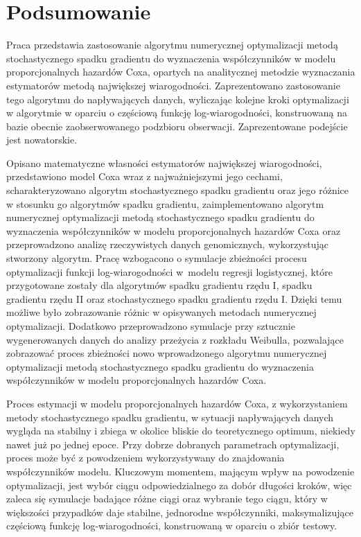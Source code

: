 \chapter*{Podsumowanie}
Praca przedstawia zastosowanie algorytmu numerycznej optymalizacji metodą stochastycznego spadku gradientu do wyznaczenia współczynników w modelu proporcjonalnych hazardów Coxa, opartych na analitycznej metodzie wyznaczania estymatorów metodą największej wiarogodności. Zaprezentowano zastosowanie tego algorytmu do napływających danych, wyliczając kolejne kroki optymalizacji w algorytmie w oparciu o częściową funkcję log-wiarogodności, konstruowaną na bazie obecnie zaobserwowanego podzbioru obserwacji. Zaprezentowane podejście jest nowatorskie.

Opisano matematyczne własności estymatorów największej wiarogodności, przedstawiono model Coxa wraz z najważniejszymi jego cechami, scharakteryzowano algorytm stochastycznego spadku gradientu oraz jego różnice w stosunku go algorytmów spadku gradientu, zaimplementowano algorytm numerycznej optymalizacji metodą stochastycznego spadku gradientu do wyznaczenia współczynników w modelu proporcjonalnych hazardów Coxa oraz przeprowadzono analizę rzeczywistych danych genomicznych, wykorzystując stworzony algorytm. Pracę wzbogacono o symulacje zbieżności procesu optymalizacji funkcji log-wiarogodności w~modelu regresji logistycznej, które przygotowane zostały dla algorytmów spadku gradientu rzędu I, spadku gradientu rzędu II oraz stochastycznego spadku gradientu rzędu I. Dzięki temu możliwe było zobrazowanie różnic w opisywanych metodach numerycznej optymalizacji. Dodatkowo przeprowadzono symulacje przy sztucznie wygenerowanych danych do analizy przeżycia z rozkładu Weibulla, pozwalające zobrazować proces zbieżności nowo wprowadzonego algorytmu numerycznej optymalizacji metodą stochastycznego spadku gradientu do wyznaczenia współczynników w modelu proporcjonalnych  hazardów Coxa.

Proces estymacji w modelu proporcjonalnych hazardów Coxa, z wykorzystaniem metody stochastycznego spadku gradientu, w sytuacji napływających danych wygląda na stabilny i zbiega w okolice bliskie do teoretycznego optimum, niekiedy nawet już po jednej epoce. Przy dobrze dobranych parametrach optymalizacji, proces może być z powodzeniem wykorzystywany do znajdowania współczynników modelu. Kluczowym momentem, mającym wpływ na powodzenie optymalizacji, jest wybór ciągu odpowiedzialnego za dobór długości kroków, więc zaleca się symulacje badające różne ciągi oraz wybranie tego ciągu, który w większości przypadków daje stabilne, jednorodne współczynniki, maksymalizujące częściową funkcję log-wiarogodności, konstruowaną w oparciu o zbiór testowy. 

